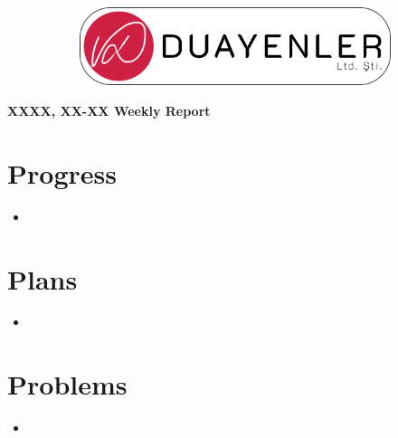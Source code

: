 \documentclass[a4paper,12pt]{article}
\begin{document}
	
\begin{figure}
	\vspace*{-.7cm}
	\centering
	\begin{figure}[H]
		\center
		\setlength{\unitlength}{\textwidth} 
		\includegraphics[width=0.9\unitlength]{../../../Documents/logos/logo3-with-stroke}
	\end{figure}
\end{figure}
\vspace*{-1.7cm}
\begin{center}
	\Large\textbf{XXXX, XX-XX Weekly Report}
	\end{center}



\section{Progress}

\begin{itemize}
	
	\item \lipsum[1]
	
\end{itemize}


\section{Plans}

\begin{itemize}
	
	\item \lipsum[2]
	
\end{itemize}


\section{Problems}	

\begin{itemize}
	
	\item \lipsum[3]
	
\end{itemize}


\end{document}

